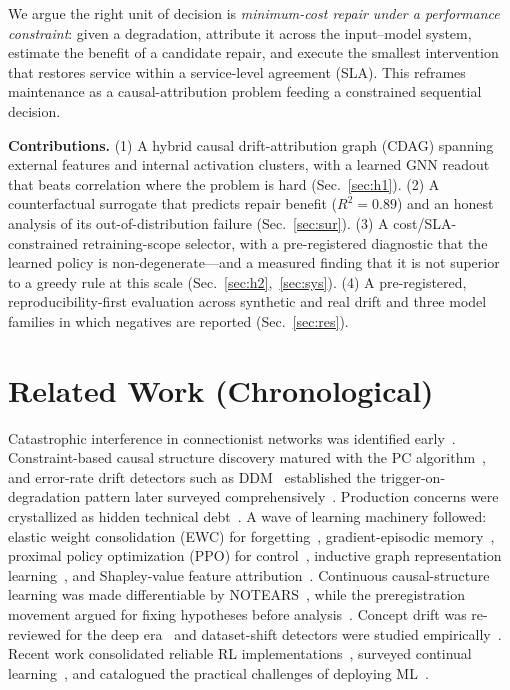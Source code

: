 \documentclass[conference]{IEEEtran}
\begin{document}
We argue the right unit of decision is \emph{minimum-cost repair under a
performance constraint}: given a degradation, attribute it across the
input--model system, estimate the benefit of a candidate repair, and execute the
smallest intervention that restores service within a service-level agreement
(SLA). This reframes maintenance as a causal-attribution problem feeding a
constrained sequential decision.

\textbf{Contributions.} (1) A hybrid causal drift-attribution graph (CDAG)
spanning external features and internal activation clusters, with a learned GNN
readout that beats correlation where the problem is hard (Sec.~\ref{sec:h1}).
(2) A counterfactual surrogate that predicts repair benefit ($R^2{=}0.89$) and an
honest analysis of its out-of-distribution failure (Sec.~\ref{sec:sur}). (3) A
cost/SLA-constrained retraining-scope selector, with a pre-registered diagnostic
that the learned policy is non-degenerate---and a measured finding that it is not
superior to a greedy rule at this scale (Sec.~\ref{sec:h2},~\ref{sec:sys}). (4) A
pre-registered, reproducibility-first evaluation across synthetic and real drift
and three model families in which negatives are reported (Sec.~\ref{sec:res}).

\section{Related Work (Chronological)}\label{sec:rw}
Catastrophic interference in connectionist networks was identified
early~\cite{mccloskey1989}. Constraint-based causal structure discovery
matured with the PC algorithm~\cite{spirtes2000}, and error-rate drift
detectors such as DDM~\cite{gama2004} established the trigger-on-degradation
pattern later surveyed comprehensively~\cite{gama2014}. Production concerns were
crystallized as hidden technical debt~\cite{sculley2015}. A wave of learning
machinery followed: elastic weight consolidation (EWC) for
forgetting~\cite{kirkpatrick2017}, gradient-episodic memory~\cite{lopezpaz2017},
proximal policy optimization (PPO) for control~\cite{schulman2017}, inductive
graph representation learning~\cite{hamilton2017,kipf2017}, and Shapley-value
feature attribution~\cite{lundberg2017}. Continuous causal-structure learning
was made differentiable by NOTEARS~\cite{zheng2018}, while the preregistration
movement argued for fixing hypotheses before analysis~\cite{nosek2018}. Concept
drift was re-reviewed for the deep era~\cite{lu2019} and dataset-shift detectors
were studied empirically~\cite{rabanser2019}. Recent work consolidated reliable
RL implementations~\cite{raffin2021}, surveyed continual
learning~\cite{delange2022}, and catalogued the practical challenges of
deploying ML~\cite{paleyes2022}.
\end{document}
